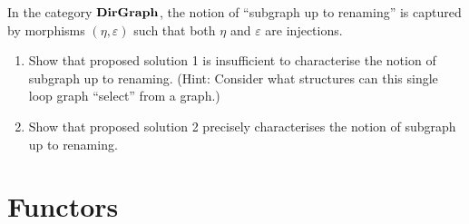 \begin{exercise}
In the category $\mathbf {DirGraph}$, the notion of ``subgraph up to renaming'' is
captured by morphisms $(\eta,\varepsilon)$ such that both $\eta$ and
$\varepsilon$ are injections.
\begin{enumerate}
  \item
    Show that proposed solution 1 is insufficient to characterise the notion
    of subgraph up to renaming.  (Hint: Consider what structures can this
    single loop graph ``select'' from a graph.)
  \item
    Show that proposed solution 2 precisely characterises the notion of
    subgraph up to renaming.
\end{enumerate}
\end{exercise}

\chapter{Functors}

